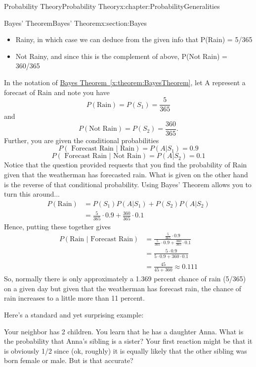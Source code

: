 \documentclass[oneside,10pt,]{book}
\newcommand{\xreffont}{\relax}
\numberwithin{equation}{section}
\begin{document}
\begin{chapterptx}{Probability Theory}{}{Probability Theory}{}{}{x:chapter:ProbabilityGeneralities}
\begin{sectionptx}{Bayes' Theorem}{}{Bayes' Theorem}{}{}{x:section:Bayes}
\begin{itemize}[label=\textbullet]
\item{}Rainy, in which case we can deduce from the given info that P(Rain) = 5\slash{}365%
\item{}Not Rainy, and since this is the complement of above, P(Not Rain) = 360\slash{}365%
\end{itemize}
In the notation of \hyperref[x:theorem:BayesTheorem]{Bayes Theorem~{\xreffont\ref{x:theorem:BayesTheorem}}}, let A represent a forecast of Rain and note you have%
\begin{equation*}
P(\text{Rain}) = P(S_1) = \frac{5}{365}
\end{equation*}
and%
\begin{equation*}
P(\text{Not Rain}) = P(S_2) = \frac{360}{365}.
\end{equation*}
Further, you are given the conditional probabilities%
\begin{equation*}
P(\text{ Forecast Rain | Rain}) = P( A | S_1) = 0.9
\end{equation*}
%
\begin{equation*}
P(\text{ Forecast Rain | Not Rain}) = P( A | S_2) = 0.1
\end{equation*}
Notice that the question provided requests that you find the probability of Rain given that the weatherman has forecasted rain. What is given on the other hand is the reverse of that conditional probability. Using Bayes' Theorem allows you to turn this around...%
\begin{align*}
P(\text{Rain}) &  = P(S_1) P( A | S_1) + P(S_2) P(A | S_2)\\
& = \frac{5}{365} \cdot 0.9 + \frac{360}{365} \cdot 0.1
\end{align*}
Hence, putting these together gives%
\begin{align*}
P(\text{Rain | Forecast Rain}) & = \frac{\frac{5}{365} \cdot 0.9}{\frac{5}{365} \cdot 0.9 + \frac{360}{365} \cdot 0.1}\\
& = \frac{5 \cdot 0.9}{5 \cdot 0.9 + 360 \cdot 0.1}\\
& = \frac{45}{45+360} \approx 0.111
\end{align*}
So, normally there is only approximately a 1.369 percent chance of rain (5\slash{}365) on a given day but given that the weatherman has forecast rain, the chance of rain increases to a little more than 11 percent.%
\par
Here's a standard and yet surprising example:%
\par
Your neighbor has 2 children. You learn that he has a daughter Anna. What is the probability that Anna’s sibling is a sister? Your first reaction might be that it is obviously 1\slash{}2 since (ok, roughly) it is equally likely that the other sibling was born female or male. But is that accurate?%

\end{sectionptx}
\end{chapterptx}
\end{document}
